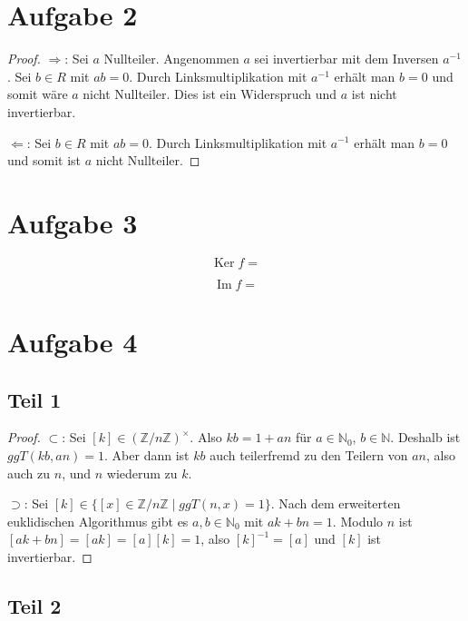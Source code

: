 \documentclass[10pt,a4paper]{article}
\DeclareMathOperator{\im}{Im}
\DeclareMathOperator{\ker}{Ker}
\begin{document}
\section{Aufgabe 2}

\begin{proof}
  $\Rightarrow$: Sei $a$ Nullteiler.
  Angenommen $a$ sei invertierbar mit dem Inversen $a^{-1}$.
  Sei $b \in R$ mit $ab = 0$.
  Durch Linksmultiplikation mit $a^{-1}$ erhält man $b = 0$ und somit wäre $a$ nicht Nullteiler.
  Dies ist ein Widerspruch und $a$ ist nicht invertierbar.

  $\Leftarrow$: Sei $b \in R$ mit $ab = 0$.
  Durch Linksmultiplikation mit $a^{-1}$ erhält man $b = 0$ und somit ist $a$ nicht Nullteiler.
\end{proof}

\section{Aufgabe 3}

\begin{equation}
  \ker f =
\end{equation}

\begin{equation}
  \im f =
\end{equation}

\section{Aufgabe 4}

\subsection{Teil 1}

\begin{proof}
  $\subset$: Sei $[k] \in (\mathbb{Z} / n \mathbb{Z})^{\times}$.
  Also $kb = 1 + an$ für $a \in \mathbb{N}_{0}$, $b \in \mathbb{N}$.
  Deshalb ist $ggT(kb, an) = 1$.
  Aber dann ist $kb$ auch teilerfremd zu den Teilern von $an$, also auch zu $n$, und $n$ wiederum zu $k$.

  $\supset$: Sei $[k] \in \{ [x] \in \mathbb{Z} / n \mathbb{Z} \mid ggT(n, x) = 1 \}$.
  Nach dem erweiterten euklidischen Algorithmus gibt es $a, b \in \mathbb{N}_{0}$ mit $ak + bn = 1$.
  Modulo $n$ ist $[ak + bn] = [ak] = [a][k] = 1$, also $[k]^{-1} = [a]$ und $[k]$ ist invertierbar.
\end{proof}

\subsection{Teil 2}
\end{document}

